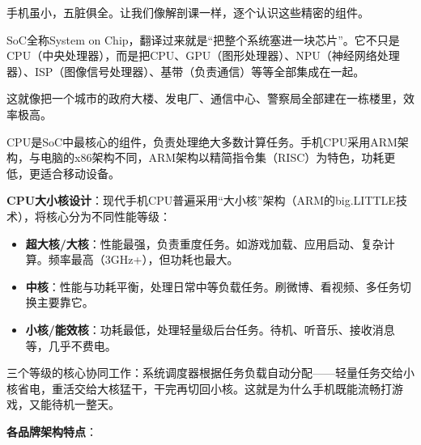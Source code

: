 


手机虽小，五脏俱全。让我们像解剖课一样，逐个认识这些精密的组件。


SoC全称System on Chip，翻译过来就是“把整个系统塞进一块芯片”。它不只是CPU（中央处理器），而是把CPU、GPU（图形处理器）、NPU（神经网络处理器）、ISP（图像信号处理器）、基带（负责通信）等等全部集成在一起。

这就像把一个城市的政府大楼、发电厂、通信中心、警察局全部建在一栋楼里，效率极高。


CPU是SoC中最核心的组件，负责处理绝大多数计算任务。手机CPU采用ARM架构，与电脑的x86架构不同，ARM架构以精简指令集（RISC）为特色，功耗更低，更适合移动设备。

\textbf{CPU大小核设计}：现代手机CPU普遍采用“大小核”架构（ARM的big.LITTLE技术），将核心分为不同性能等级：

\begin{itemize}
  \item \textbf{超大核/大核}：性能最强，负责重度任务。如游戏加载、应用启动、复杂计算。频率最高（3GHz+），但功耗也最大。
  \item \textbf{中核}：性能与功耗平衡，处理日常中等负载任务。刷微博、看视频、多任务切换主要靠它。
  \item \textbf{小核/能效核}：功耗最低，处理轻量级后台任务。待机、听音乐、接收消息等，几乎不费电。
\end{itemize}

三个等级的核心协同工作：系统调度器根据任务负载自动分配——轻量任务交给小核省电，重活交给大核猛干，干完再切回小核。这就是为什么手机既能流畅打游戏，又能待机一整天。

\textbf{各品牌架构特点}：

